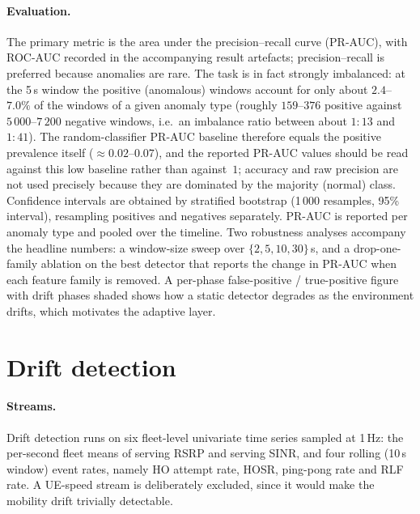 \paragraph{Evaluation.}
The primary metric is the area under the precision--recall curve (PR-AUC), with
ROC-AUC recorded in the accompanying result artefacts; precision--recall is
preferred because anomalies are rare. The task is in fact strongly imbalanced: at the 5\,s window the positive
(anomalous) windows account for only about $2.4$--$7.0\%$ of the windows of a
given anomaly type (roughly $159$--$376$ positive against $5\,000$--$7\,200$
negative windows, i.e.\ an imbalance ratio between about $1{:}13$ and $1{:}41$).
The random-classifier PR-AUC baseline therefore equals the positive prevalence
itself ($\approx 0.02$--$0.07$), and the reported PR-AUC values should be read
against this low baseline rather than against~$1$; accuracy and raw precision
are not used precisely because they are dominated by the majority (normal)
class. Confidence intervals are obtained by stratified bootstrap (1\,000
resamples, 95\% interval), resampling positives and negatives separately.
PR-AUC is reported per anomaly type and pooled over the timeline. Two robustness
analyses accompany the headline numbers: a window-size sweep over
$\{2,5,10,30\}$\,s, and a drop-one-family ablation on the best detector that
reports the change in PR-AUC when each feature family is removed. A per-phase
false-positive / true-positive figure with drift phases shaded shows how a
static detector degrades as the environment drifts, which motivates the adaptive
layer.

\section{Drift detection}
\label{sec:drift-method}

\paragraph{Streams.}
Drift detection runs on six fleet-level univariate time series sampled at 1\,Hz:
the per-second fleet means of serving RSRP and serving SINR, and four rolling
(10\,s window) event rates, namely HO attempt rate, HOSR, ping-pong rate and RLF
rate. A UE-speed stream is deliberately excluded, since it would make the
mobility drift trivially detectable.

